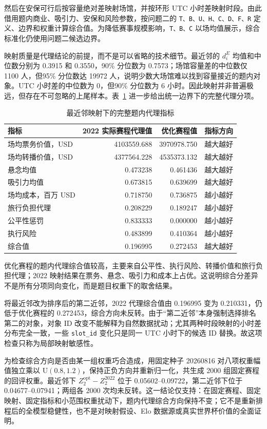 然后在安保可行后按容量绝对差映射场馆，并按环形 UTC 小时差映射时段。由此借用题内商业、吸引力、安保和风险参数，按问题二的 \texttt{T、B、U、H、C、D、F、R} 定义、边界和权重计算综合值。为降低赛事规模影响，\texttt{T、B、C} 以场均值展示，综合标准化仍使用问题二候选边界。

映射质量是代理结论的前提，而不是可以省略的技术细节。最近邻的 $d_i^E$ 均值和中位数分别为 0.3915 和 0.3550，90\% 分位数为 0.7573；场馆容量差的中位数仅 1100 人，但95\% 分位数达 19972 人，说明少数大场馆难以找到容量接近的题内对象。UTC 小时差的中位数为 0，但90\% 分位数为 6 小时。因此映射并非普遍极远，但存在不可忽略的上尾样本。表~\ref{tab:q4-proxy} 进一步给出统一边界下的完整代理分项。

\begin{longtable}[]{@{}lrrl@{}}
\caption{最近邻映射下的完整题内代理指标}\label{tab:q4-proxy}\\
\toprule\noalign{}
指标 & 2022 实际赛程代理值 & 优化赛程值 & 指标方向 \\
\midrule\noalign{}
\endhead
\bottomrule\noalign{}
\endlastfoot
场均票务价值，USD & 4103559.688 & 3970978.750 & 越大越好 \\
场均转播价值，USD & 4377564.228 & 4535373.132 & 越大越好 \\
悬念均值 & 0.473238 & 0.461436 & 越大越好 \\
吸引力均值 & 0.673815 & 0.639699 & 越大越好 \\
场均成本，百万 USD & 0.718750 & 0.736875 & 越小越好 \\
旅行负担代理 & 0.208229 & 0.189247 & 越小越好 \\
公平性惩罚 & 0.833333 & 0.000000 & 越小越好 \\
执行风险 & 0.483899 & 0.410364 & 越小越好 \\
综合值 & 0.196995 & 0.272453 & 越大越好 \\
\end{longtable}

优化赛程的题内代理综合值较高，主要来自公平性、执行风险、转播价值和旅行负担代理；2022 映射结果在票务、悬念、吸引力和成本上占优。这说明综合分差异不是所有分项同向变化，而是题目权重下的取舍结果。

将最近邻改为排序后的第二近邻，2022 代理综合值由 0.196995 变为 0.210331，仍低于优化赛程的 0.272453，综合方向未反转。由于“第二近邻”本身强制选择排名第二的对象，对象 ID 改变不能解释为自然数据扰动；尤其两种时段映射的小时差分布完全一致，一些 \texttt{slot\_id} 变化只是同一 UTC 小时下的候选 ID 替换。故这项检查只称为局部映射敏感性。

为检查综合方向是否由某一组权重巧合造成，用固定种子 20260816 对八项权重幅值独立乘以 $\mathrm U(0.8,1.2)$，保持正负方向并重新归一化，共生成 2000 组固定赛程的回评权重。最近邻下 $Z_2^{\mathrm{opt}}-Z_2^{2022}$ 位于 0.05602--0.09722，第二近邻下位于 0.04677--0.07941；两组各 2000 次均未反转。这一结论仅支持：在固定赛程、固定映射、固定指标和小范围权重扰动下，题内代理综合方向保持不变；它不是重新排程后的全模型稳健性，也不是对映射假设、Elo 数据源或真实世界杯价值的全面证明。

